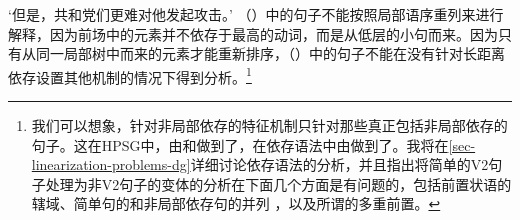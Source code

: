 \glt `但是，共和党们更难对他发起攻击。'
\zl
（）中的句子不能按照局部语序重列来进行解释，因为前场中的元素并不依存于最高的动词，而是从低层的小句而来。因为只有从同一局部树中而来的元素才能重新排序，（）中的句子不能在没有针对长距离依存设置其他机制的情况下得到分析。\footnote{%
我们可以想象，针对非局部依存的特征机制只针对那些真正包括非局部依存的句子。这在HPSG\indexhpsgc 中，由\citet{Kathol95a}和\citet{Wetta2011a}做到了，在依存语法中由\citet{GO2009a}做到了。我将在\ref{sec-linearization-problems-dg}详细讨论依存语法的分析，并且指出将简单的V2句子处理为非V2句子的变体的分析在下面几个方面是有问题的，包括前置状语的辖域、简单句的和非局部依存句的并列 ，以及所谓的多重前置。
}

